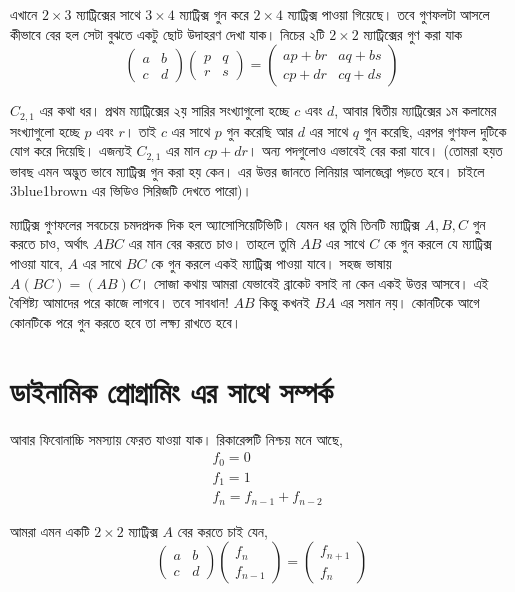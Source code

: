 এখানে $2 \times 3$ ম্যাট্রিক্সের সাথে $3 \times 4$ ম্যাট্রিক্স গুন করে $2 \times 4$ ম্যাট্রিক্স পাওয়া গিয়েছে। তবে গুণফলটা আসলে কীভাবে বের হল সেটা বুঝতে একটু ছোট উদাহরণ দেখা যাক। নিচের ২টি $2 \times 2$ ম্যাট্রিক্সের গুণ করা যাক
 $$
\begin{pmatrix}
a & b \\
c & d
\end{pmatrix}
\begin{pmatrix}
p & q \\
r & s
\end{pmatrix} = 
\begin{pmatrix}
ap + br & aq + bs \\
cp + dr & cq + ds
\end{pmatrix}
$$

$C_{2, 1}$ এর কথা ধর। প্রথম ম্যাট্রিক্সের ২য় সারির সংখ্যাগুলো হচ্ছে $c$ এবং $d$, আবার দ্বিতীয় ম্যাট্রিক্সের ১ম কলামের সংখ্যাগুলো হচ্ছে $p$ এবং $r$। তাই $c$ এর সাথে $p$ গুন করেছি আর $d$ এর সাথে $q$ গুন  করেছি, এরপর গুণফল দুটিকে যোগ করে দিয়েছি। এজন্যই $C_{2, 1}$ এর মান $cp + dr$। অন্য পদগুলোও এভাবেই বের করা যাবে। (তোমরা হয়ত ভাবছ এমন অদ্ভুত ভাবে ম্যাট্রিক্স গুন করা হয় কেন। এর উত্তর জানতে লিনিয়ার আলজেব্রা পড়তে হবে। চাইলে 3blue1brown এর ভিডিও সিরিজটি দেখতে পারো)। 

ম্যাট্রিক্স গুণফলের সবচেয়ে চমদপ্রদক দিক হল অ্যাসোসিয়েটিভিটি। যেমন ধর তুমি তিনটি ম্যাট্রিক্স $A, B, C$ গুন করতে চাও, অর্থাৎ $ABC$ এর মান বের করতে চাও। তাহলে তুমি $AB$ এর সাথে $C$ কে গুন করলে যে ম্যাট্রিক্স পাওয়া যাবে, $A$ এর সাথে $BC$ কে গুন করলে একই ম্যাট্রিক্স পাওয়া যাবে। সহজ ভাষায় $A(BC) = (AB)C$। সোজা কথায় আমরা যেভাবেই ব্রাকেট বসাই না কেন একই উত্তর আসবে। এই বৈশিষ্ট্য আমাদের পরে কাজে লাগবে। তবে সাবধান! $AB$ কিন্তু কখনই $BA$ এর সমান নয়। কোনটিকে আগে কোনটিকে পরে গুন করতে হবে তা লক্ষ্য রাখতে হবে। 

\section{ডাইনামিক প্রোগ্রামিং এর সাথে সম্পর্ক}
আবার ফিবোনাচ্চি সমস্যায় ফেরত যাওয়া যাক। রিকারেন্সটি নিশ্চয় মনে আছে,
\begin{align*}
& f_{0} = 0 \\
& f_{1} = 1 \\
& f_{n} = f_{n - 1} + f_{n - 2}
\end{align*}

আমরা এমন একটি $2 \times 2$ ম্যাট্রিক্স $A$ বের করতে চাই যেন,
$$
\begin{pmatrix}
a & b \\
c & d
\end{pmatrix} 
\begin{pmatrix}
f_{n} \\
f_{n - 1}
\end{pmatrix}
= 
\begin{pmatrix}
f_{n + 1} \\
f_{n}
\end{pmatrix}
$$ 

